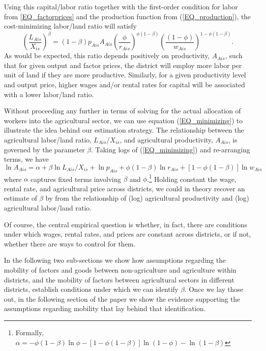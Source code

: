 Using this capital/labor ratio together with the first-order condition for labor from \ref{EQ_factorprices} and the production function from (\ref{EQ_production}), the cost-minimizing labor/land ratio will satisfy 
\begin{equation}
	\left(\frac{L_{Ais}}{X_{is}}\right)^{\beta} = (1-\beta) p_{Ais} A_{Ais} \left(\frac{\phi}{r_{Ais}}\right)^{\phi(1-\beta)}\left(\frac{(1-\phi)}{w_{Ais}}\right)^{1 - \phi(1-\beta)}. \label{EQ_minimizing}
\end{equation}
As would be expected, this ratio depends positively on productivity, $A_{Ais}$, such that for given output and factor prices, the district will employ more labor per unit of land if they are more productive. Similarly, for a given productivity level and output price, higher wages and/or rental rates for capital will be associated with a lower labor/land ratio.

Without proceeding any further in terms of solving for the actual allocation of workers into the agricultural sector, we can use equation (\ref{EQ_minimizing}) to illustrate the idea behind our estimation strategy. The relationship between the agricultural labor/land ratio, $L_{Ais}/X_{is}$, and agricultural productivity, $A_{Ais}$, is governed by the parameter $\beta$. Taking logs of (\ref{EQ_minimizing}) and re-arranging terms, we have
\begin{equation*}
	\ln A_{Ais} = \alpha + \beta \ln L_{Ais}/X_{is} + \ln p_{Ais} + \phi(1-\beta)\ln r_{Ais} + \left[1-\phi(1-\beta)\right] \ln w_{Ais}
\end{equation*}
where $\alpha$ captures fixed terms involving $\beta$ and $\phi$.\footnote{Formally, $\alpha = -\phi(1-\beta)\ln \phi - \left[1-\phi(1-\beta)\right]\ln (1-\phi) - \ln (1-\beta)$} Holding constant the wage, rental rate, and agricultural price across districts, we could in theory recover an estimate of $\beta$ by from the relationship of (log) agricultural productivity and (log) agricultural labor/land ratio. 

Of course, the central empirical question is whether, in fact, there are conditions under which wages, rental rates, and prices are constant across districts, or if not, whether there are ways to control for them. 



In the following two sub-sections we show how assumptions regarding the mobility of factors and goods between non-agriculture and agriculture within districts, and the mobility of factors between agricultural sectors in different districts, establish conditions under which we can identify $\beta$. Once we lay those out, in the following section of the paper we show the evidence supporting the assumptions regarding mobility that lay behind that identification.

